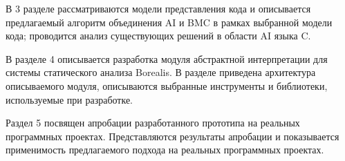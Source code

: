 В 3 разделе рассматриваются модели представления кода и описывается предлагаемый 
алгоритм объединения AI и BMC в рамках выбранной модели кода; проводится анализ существующих решений в области AI языка C.

В разделе 4 описывается разработка модуля абстрактной интерпретации для системы 
статического анализа Borealis. В разделе приведена архитектура описываемого 
модуля, описываются выбранные инструменты и библиотеки, используемые при 
разработке.

Раздел 5 посвящен апробации разработанного прототипа на реальных программных 
проектах. Представляются результаты апробации и показывается применимость
предлагаемого подхода на реальных программных проектах.